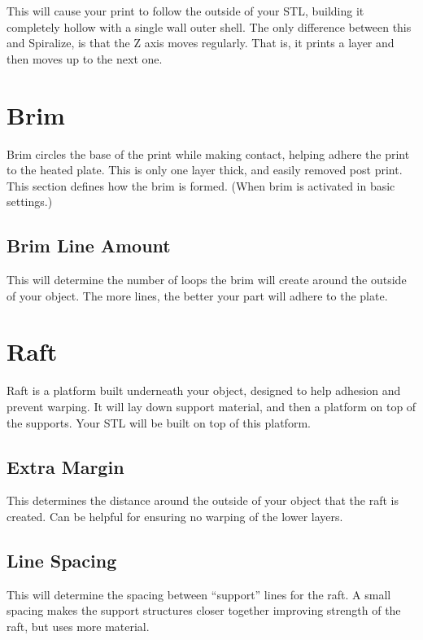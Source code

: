 This will cause your print to follow the outside of your STL, building it completely hollow with a single wall outer shell. The only difference between this and Spiralize, is that the Z axis moves regularly. That is, it prints a layer and then moves up to the next one.

\section{Brim}

Brim circles the base of the print while making contact, helping adhere the print to the heated plate. This is only one layer thick, and easily removed post print. This section defines how the brim is formed. (When brim is activated in basic settings.)

\subsection{Brim Line Amount}
This will determine the number of loops the brim will create around the outside of your object. The more lines, the better your part will adhere to the plate. 

\section{Raft}

Raft is a platform built underneath your object, designed to help adhesion and prevent warping. It will lay down support material, and then a platform on top of the supports. Your STL will be built on top of this platform. 

\subsection{Extra Margin}

This determines the distance around the outside of your object that the raft is created. Can be helpful for ensuring no warping of the lower layers.

\subsection{Line Spacing}

This will determine the spacing between “support” lines for the raft. A small spacing makes the support structures closer together improving strength of the raft, but uses more material.


